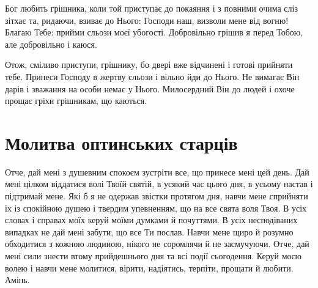 \documentclass[chapters.tex]{subfiles}
\begin{document}
Бог любить грішника, коли той приступає до покаяння і з повними очима сліз зітхає та, ридаючи, взиває до Нього: Господи наш, визволи мене від вогню! Благаю Тебе: прийми сльози моєї убогості. Добровільно грішив я перед Тобою, але добровільно і каюся.

Отож, сміливо приступи, грішнику, бо двері вже відчинені і готові прийняти тебе. Принеси Господу в жертву сльози і вільно йди до Нього. Не вимагає Він дарів і зважання на особи немає у Нього. Милосердний Він до людей і охоче прощає гріхи грішникам, що каються.

\section{Молитва оптинських старців}
Отче, дай мені з душевним спокоєм зустріти все, що принесе мені цей день. Дай мені цілком віддатися волі Твоїй святій, в усякий час цього дня, в усьому настав і підтримай мене. Які б я не одержав звістки протягом дня, навчи мене сприйняти їх із спокійною душею і твердим упевненням, що на все свята воля Твоя. В усіх словах і справах моїх керуй моїми думками й почуттями. В усіх несподіваних випадках не дай мені забути, що все Ти послав. Навчи мене щиро й розумно обходитися з кожною людиною, нікого не соромлячи й не засмучуючи. Отче, дай мені сили знести втому прийдешнього дня та всі події сьогодення. Керуй моєю волею і навчи мене молитися, вірити, надіятись, терпіти, прощати й любити. Амінь.
\end{document}
